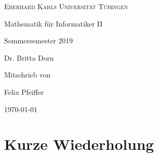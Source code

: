\documentclass[a4paper,11pt]{article}
\begin{document}

\begin{titlepage}
	\centering
	{\scshape\LARGE Eberhard Karls Universität Tübingen \par}
	\vspace{2.5cm}
	{\huge Mathematik für Informatiker II\par}
	\vspace{1.5cm}
	{\Large Sommersemester 2019\par}
	\vspace{1.5cm}
	{\Large Dr. Britta Dorn\par}
	\vspace{4cm}
	{\Large\itshape \par}
	Mitschrieb von\par
	Felix Pfeiffer
	\vfill

	{\large \today\par}
\end{titlepage}

\newpage
{}

\tableofcontents

\newpage
{}
\section{Kurze Wiederholung}
\end{document}
